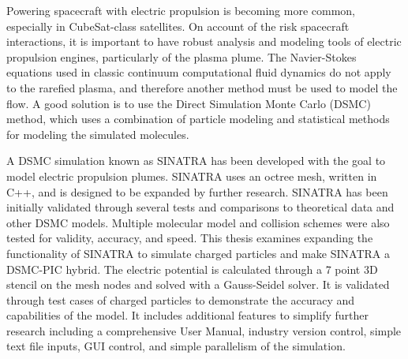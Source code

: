 Powering spacecraft with electric propulsion is becoming more common, especially in CubeSat-class satellites. On account of the risk spacecraft interactions, it is important to have robust analysis and modeling tools of electric propulsion engines, particularly of the plasma plume. The Navier-Stokes equations used in classic continuum computational fluid dynamics do not apply to the rarefied plasma, and therefore another method must be used to model the flow. A good solution is to use the Direct Simulation Monte Carlo (DSMC) method, which uses a combination of particle modeling and statistical methods for modeling the simulated molecules. 

A DSMC simulation known as SINATRA has been developed with the goal to model electric propulsion plumes. SINATRA uses an octree mesh, written in C++, and is designed to be expanded by further research. SINATRA has been initially validated through several tests and comparisons to theoretical data and other DSMC models. Multiple molecular model and collision schemes were also tested for validity, accuracy, and speed. This thesis examines expanding the functionality of SINATRA to simulate charged particles and make SINATRA a DSMC-PIC hybrid. The electric potential is calculated through a 7 point 3D stencil on the mesh nodes and solved with a Gauss-Seidel solver. It is validated through test cases of charged particles to demonstrate the accuracy and capabilities of the model. It includes additional features to simplify further research including  a comprehensive User Manual, industry version control, simple text file inputs, GUI control, and simple parallelism of the simulation. 


